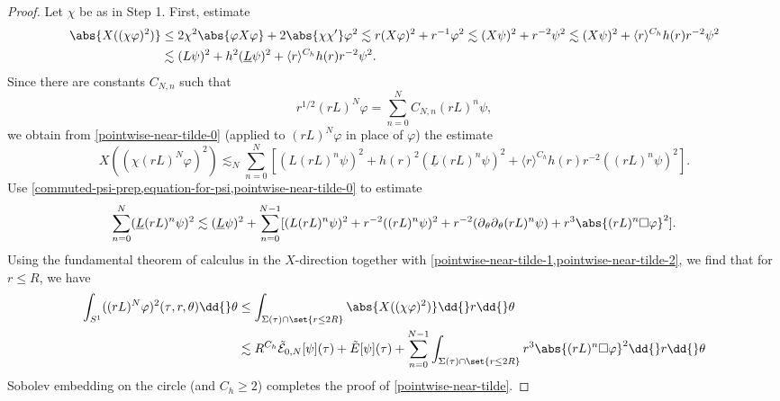 \documentclass[10pt, reqno]{amsart}
\begin{document}
\begin{proof}
 Let \(\chi{}\) be as in Step 1. First, estimate
\begin{equation}\label{pointwise-near-tilde-0}
\begin{split}
\abs{X((\chi{}\varphi{})^2)} &\le  2\chi^2\abs{\varphi{}X\varphi{}} + 2\abs{\chi{}\chi{}'}\varphi^2\lesssim r(X\varphi{})^2 + r^{-1}\varphi^2\lesssim (X\psi{})^2 + r^{-2}\psi{}^2\lesssim  (X\psi{})^2 + \langle{}r\rangle^{C_h}h(r)r^{-2}\psi^2 \\
&\lesssim (L\psi{})^2 + h^2(\underline{L}\psi{})^2 + \langle{}r\rangle^{C_h}h(r)r^{-2}\psi^2.
\end{split}
\end{equation}
Since there are constants \(C_{N,n}\) such that
\begin{equation}
r^{1/2}(rL)^N\varphi{} = \sum_{n=0}^NC_{N,n}(rL)^n\psi{},
\end{equation}
we obtain from \cref{pointwise-near-tilde-0} (applied to \((rL)^N\varphi{}\) in place of
\(\varphi{}\)) the estimate
\begin{equation}\label{pointwise-near-tilde-1}
X((\chi{}(rL)^N\varphi{})^2)\lesssim_N \sum_{n=0}^N[(L(rL)^n\psi{})^2 + h(r)^2(\underline{L}(rL)^n\psi{})^2 + \langle{}r\rangle^{C_h}h(r)r^{-2}((rL)^n\psi{})^2].
\end{equation}
Use \cref{commuted-psi-prep,equation-for-psi,pointwise-near-tilde-0} to estimate
\begin{equation}\label{pointwise-near-tilde-2}
\sum_{n=0}^N(\underline{L}(rL)^n\psi)^2\lesssim (\underline{L}\psi{})^2 + \sum_{n=0}^{N-1} [(L(rL)^n\psi{})^2 + r^{-2}((rL)^n\psi{})^2 + r^{-2}(\partial{}_\theta{}\partial{}_\theta{}(rL)^n\psi{}) + r^3\abs{(rL)^n\Box{}\varphi{}}^2].
\end{equation}
Using the fundamental theorem of calculus in the \(X\)-direction together with
\cref{pointwise-near-tilde-1,pointwise-near-tilde-2}, we find that for \(r\le R\), we
have
\begin{equation}\label{pointwise-near-tilde-prep}
\begin{split}
\int _{S^1} ((rL)^N\varphi{})^2(\tau{},r,\theta{})\dd{}\theta{}&\le \int _{\Sigma{}(\tau{})\cap \set{r\le 2R}} \abs{X((\chi{}\varphi{})^2)}\dd{}r\dd{}\theta{}\\
&\lesssim R^{C_h}\tilde{\mathcal{E}}_{0,N}[\psi{}](\tau{}) + \tilde{E}[\psi{}](\tau{}) +\sum_{n=0}^{N-1} \int _{\Sigma{}(\tau{})\cap \set{r\le 2R}} r^3\abs{(rL)^n\Box{}\varphi{}}^2\dd{}r\dd{}\theta{}
\end{split}
\end{equation}
Sobolev embedding on the circle (and \(C_h\ge 2\)) completes the proof of \cref{pointwise-near-tilde}.


\end{proof}
\end{document}
